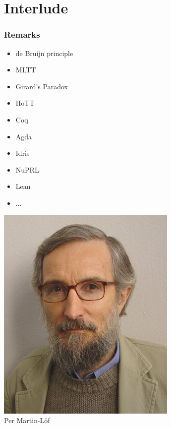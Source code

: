 \documentclass[xetex]{beamer}
\begin{document}
\section{Interlude}

\begin{frame}
  \frametitle{Remarks}
  


    \begin{minipage}{.45\textwidth}
      \begin{itemize}
        \item de Bruijn principle
        \item MLTT
        \item Girard's Paradox
        \item HoTT
        \item Coq
        \item Agda
        \item Idris
        \item NuPRL
        \item Lean
        \item ...
      \end{itemize}
    \end{minipage}
    \begin{minipage}{.45\textwidth}
      \begin{center}
      \includegraphics[scale=0.3]{Martinlof}
      \\ Per Martin-L\"of
      \end{center}
    \end{minipage}
\end{frame}
\end{document}
